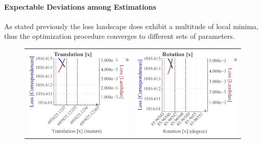 \paragraph{Expectable Deviations among Estimations}
As stated previously the loss landscape does exhibit a multitude of local minima, thus the optimization procedure converges to different sets of parameters. 

\begin{figure}[t]
  \centering
  \begin{tabular}{cc}
    \includegraphics[width=0.45 \linewidth]{diagrams/calibration/s40_n_far_small/parameters_all.csv/Translation[x]_vs_Loss[Correspondences]_vs_Loss[Lambdas]_cluster_All.png} &
    \includegraphics[width=0.45 \linewidth]{diagrams/calibration/s40_n_far_small/parameters_all.csv/Rotation[x]_vs_Loss[Correspondences]_vs_Loss[Lambdas]_cluster_All.png} \\
    

\end{tabular}
\end{figure}
